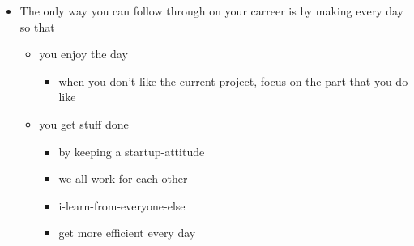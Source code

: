 \begin{itemize}
    \item The only way you can follow through on your carreer is by making every day so that 
        \begin{itemize}
            \item you enjoy the day
                \begin{itemize}
                    \item when you don't like the current project, focus on the part that you do like
                \end{itemize}
            \item you get stuff done
                \begin{itemize}
                    \item by keeping a startup-attitude
                    \item we-all-work-for-each-other
                    \item i-learn-from-everyone-else
                    \item get more efficient every day
                \end{itemize}
        \end{itemize}
\end{itemize}